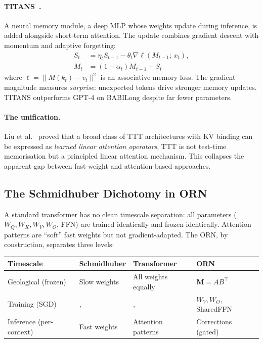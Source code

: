 \documentclass[11pt, a4paper]{article}
\newcommand{\M}{\mathbf{M}}
\theoremstyle{plain}
\theoremstyle{definition}
\theoremstyle{remark}
\begin{document}
\paragraph{TITANS~\cite{behrouz2025titans}.}
A neural memory module, a deep MLP whose weights update during inference, is added alongside short-term attention.
The update combines gradient descent with momentum and adaptive forgetting:
\begin{align}
S_t &= \eta_t S_{t-1} - \theta_t \nabla \ell(M_{t-1};\, x_t), \\
M_t &= (1 - \alpha_t) M_{t-1} + S_t
\end{align}
where $\ell = \| M(k_t) - v_t \|^2$ is an associative memory loss.
The gradient magnitude measures \emph{surprise}: unexpected tokens drive stronger memory updates.
TITANS outperforms GPT-4 on BABILong despite far fewer parameters.

\paragraph{The unification.}
Liu et al.~\cite{liu2026tttla} proved that a broad class of TTT architectures with KV binding can be expressed as \emph{learned linear attention operators}, TTT is not test-time memorisation but a principled linear attention mechanism.
This collapses the apparent gap between fast-weight and attention-based approaches.

\subsection{The Schmidhuber Dichotomy in ORN}

A standard transformer has no clean timescale separation: all parameters ($W_Q, W_K, W_V, W_O$, FFN) are trained identically and frozen identically.
Attention patterns are ``soft'' fast weights but not gradient-adapted.
The ORN, by construction, separates three levels:

\begin{center}\small
\begin{tabular}{llll}
\toprule
\textbf{Timescale} & \textbf{Schmidhuber} & \textbf{Transformer} & \textbf{ORN} \\
\midrule
Geological (frozen) & Slow weights & All weights equally & $\M = AB^\top$ \\
Training (SGD) & ,  & ,  & $W_V, W_O$, SharedFFN \\
Inference (per-context) & Fast weights & Attention patterns & Corrections (gated) \\
\bottomrule
\end{tabular}
\end{center}
\end{document}
